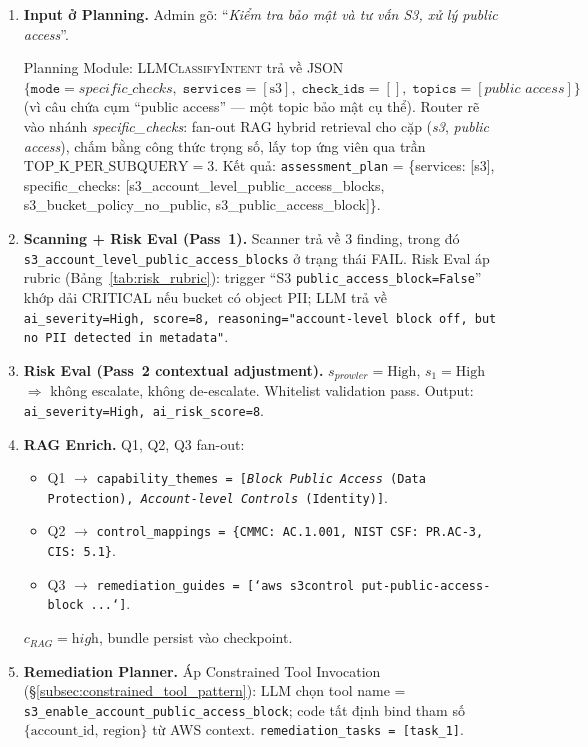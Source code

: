 \begin{enumerate}
  \item \textbf{Input ở Planning.} Admin gõ: ``\textit{Kiểm tra bảo mật và tư vấn S3, xử lý public access}''.

  Planning Module: \textsc{LLMClassifyIntent} trả về JSON $\{\texttt{mode}=\textit{specific\_checks},\; \texttt{services}=[\text{s3}],\; \texttt{check\_ids}=[],\; \texttt{topics}=[\textit{public access}]\}$ (vì câu chứa cụm ``public access'' --- một topic bảo mật cụ thể). Router rẽ vào nhánh \textit{specific\_checks}: fan-out RAG hybrid retrieval cho cặp (\textit{s3}, \textit{public access}), chấm bằng công thức trọng số, lấy top ứng viên qua trần $\text{TOP\_K\_PER\_SUBQUERY}=3$. Kết quả: \texttt{assessment\_plan} = \{services: [s3], specific\_checks: [s3\_account\_level\_public\_access\_blocks, s3\_bucket\_policy\_no\_public, s3\_public\_access\_block]\}.

  \item \textbf{Scanning + Risk Eval (Pass~1).} Scanner trả về 3 finding, trong đó \texttt{s3\_account\_level\_public\_access\_blocks} ở trạng thái FAIL. Risk Eval áp rubric (Bảng~\ref{tab:risk_rubric}): trigger ``S3 \texttt{public\_access\_block=False}'' khớp dải CRITICAL nếu bucket có object PII; LLM trả về \texttt{ai\_severity=High, score=8, reasoning="account-level block off, but no PII detected in metadata"}.

  \item \textbf{Risk Eval (Pass~2 contextual adjustment).} $s_{prowler}=\text{High}$, $s_1=\text{High}$ $\Rightarrow$ không escalate, không de-escalate. Whitelist validation pass. Output: \texttt{ai\_severity=High, ai\_risk\_score=8}.

  \item \textbf{RAG Enrich.} Q1, Q2, Q3 fan-out:
    \begin{itemize}
      \item Q1 $\to$ \texttt{capability\_themes = [\textit{Block Public Access} (Data Protection), \textit{Account-level Controls} (Identity)]}.
      \item Q2 $\to$ \texttt{control\_mappings = \{CMMC: AC.1.001, NIST CSF: PR.AC-3, CIS: 5.1\}}.
      \item Q3 $\to$ \texttt{remediation\_guides = [`aws s3control put-public-access-block ...`]}.
    \end{itemize}
    $c_{RAG}=\textit{high}$, bundle persist vào checkpoint.

  \item \textbf{Remediation Planner.} Áp Constrained Tool Invocation (\S\ref{subsec:constrained_tool_pattern}): LLM chọn tool name = \texttt{s3\_enable\_account\_public\_access\_block}; code tất định bind tham số $\{\text{account\_id, region}\}$ từ AWS context. \texttt{remediation\_tasks = [task\_1]}.


\end{enumerate}
